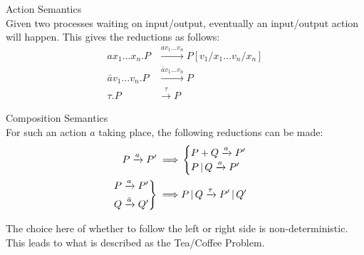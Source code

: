     \begin{definition}{Action Semantics\\}
        Given two processes waiting on input/output, eventually an input/output action will happen.
        This gives the reductions as follows:
        \begin{align*}
            a x_1 \ldots x_n . P        & \xrightarrow{a v_1 \ldots v_n} P[v_1 / x_1 \ldots v_n / x_n] \\
            \bar{a} v_1 \ldots v_n . P  & \xrightarrow{\bar{a} v_1 \ldots v_n} P \\
            \tau . P                    & \xrightarrow{\tau} P
        \end{align*}
    \end{definition}


    \begin{definition}{Composition Semantics\\}
        For such an action $a$ taking place, the following reductions can be made:
        \begin{align*}
            P \xrightarrow{a} P' \implies &
            \begin{cases}
                P + Q \xrightarrow{a} P' \\
                P \, | \, Q \xrightarrow{a} P' \\
            \end{cases} \\
            \begin{rcases}
                P \xrightarrow{a} P' \\
                Q \xrightarrow{\bar{a}} Q' \\
            \end{rcases} \implies &
            P \, | \, Q \xrightarrow{\tau} P' \, | \, Q'
        \end{align*}
    \end{definition}
    The choice here of whether to follow the left or right side is non-deterministic.
    This leads to what is described as the Tea/Coffee Problem.


